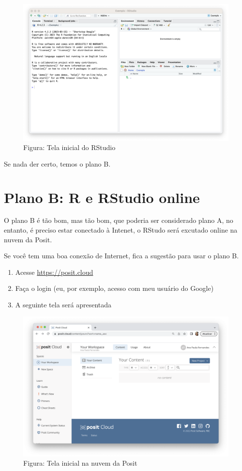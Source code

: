 \documentclass[
]{book}
\begin{document}
\begin{figure}
\centering
\includegraphics{telaRStudio.png}
\caption{ Figura: Tela inicial do RStudio}
\end{figure}

Se nada der certo, temos o plano B.

\section{Plano B: R e RStudio online}\label{plano-b-r-e-rstudio-online}

O plano B é tão bom, mas tão bom, que poderia ser considerado plano A, no entanto, é preciso estar conectado à Intenet, o RStudo será excutado online na nuvem da Posit.

Se você tem uma boa conexão de Internet, fica a sugestão para usar o plano B.

\begin{enumerate}
\def\labelenumi{\arabic{enumi}.}
\item
  Acesse \url{https://posit.cloud}
\item
  Faça o login (eu, por exemplo, acesso com meu usuário do Google)
\item
  A seguinte tela será apresentada
\end{enumerate}

\begin{figure}
\centering
\includegraphics{telaPosit.png}
\caption{Figura: Tela inicial na nuvem da Posit}
\end{figure}
\end{document}
